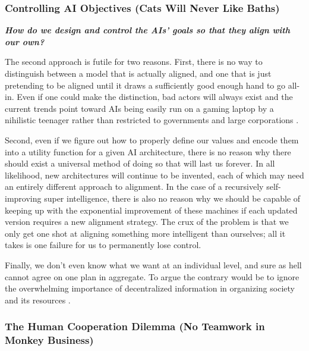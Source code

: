 \documentclass{article}
\begin{document}
\subsubsection{Controlling AI Objectives (Cats Will Never Like Baths)}
\label{sec:ControllingAIObjectives}


\noindent \begin{center}\begin{minipage}[t]{0.9\columnwidth}
    \textbf{\textit{How do we design and control the AIs’ goals so that they align with our own?}}
\end{minipage}\end{center} 
\vspace{0.05in}

The second approach is futile for two reasons. First, there is no way to distinguish between a model that is actually aligned, and one that is just pretending to be aligned until it draws a sufficiently good enough hand to go all-in. 
Even if one could make the distinction, bad actors will always exist and the current trends point toward AIs being easily run on a gaming laptop by a nihilistic teenager rather than restricted to governments and large corporations \cite{noMoat}.\par

Second, even if we figure out how to properly define our values and encode them into a utility function for a given AI architecture, there is no reason why there should exist a universal method of doing so that will last us forever. 
In all likelihood, new architectures will continue to be invented, each of which may need an entirely different approach to alignment.
In the case of a recursively self-improving super intelligence, there is also no reason why we should be capable of keeping up with the exponential improvement of these machines if each updated version requires a new alignment strategy.
The crux of the problem is that we only get one shot at aligning something more intelligent than ourselves; all it takes is one failure for us to permanently lose control.\par

Finally, we don't even know what we want at an individual level, and sure as hell cannot agree on one plan in aggregate.
To argue the contrary would be to ignore the overwhelming importance of decentralized information in organizing society and its resources \cite{hayek1945use}.



\subsubsection{The Human Cooperation Dilemma (No Teamwork in Monkey Business)}
\label{sec:HumanCooperationDilemma}
\end{document}
